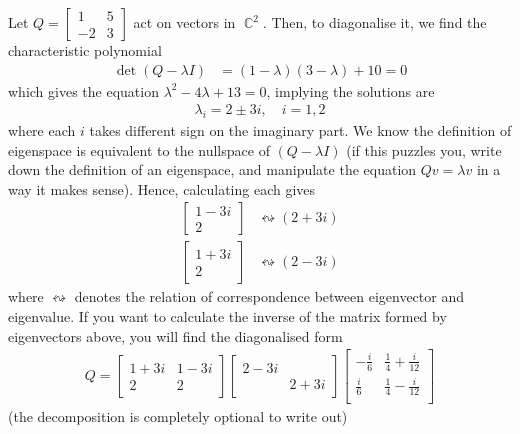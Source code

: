 \documentclass{amsart}
\theoremstyle{definition}
\theoremstyle{definition}
\DeclareMathOperator{\Com}{\mathbb{C}}
\DeclareMathOperator{\1}{\mathbbm{1}}
\begin{document}
\begin{enumerate}[itemsep = 2mm]
		Let $Q = \begin{bmatrix}
		 1 & 5 \\ -2 & 3
		\end{bmatrix}$ act on vectors in $\Com^2$. Then, to diagonalise it, we find the characteristic polynomial
		\begin{align*}
		\det(Q - \lambda I) &= (1-\lambda)(3-\lambda) + 10 = 0
		\end{align*}
		which gives the equation $\lambda^2 - 4\lambda + 13 = 0$, implying the solutions are
		\begin{align*}
		\lambda_i = 2 \pm 3 i, \quad i =1,2
		\end{align*}
		where each $i$ takes different sign on the imaginary part. We know the definition of eigenspace is equivalent to the nullspace of $(Q - \lambda I)$ (if this puzzles you, write down the definition of an eigenspace, and manipulate the equation $Qv = \lambda v$ in a way it makes sense). Hence, calculating each gives
		\begin{align*}
		\begin{bmatrix}
			1 - 3i \\ 2
		\end{bmatrix} & \leftrightsquigarrow (2+3i) \\
		\begin{bmatrix}
		1 + 3i \\ 2
		\end{bmatrix} & \leftrightsquigarrow (2-3i)
		\end{align*}
		where $\leftrightsquigarrow $ denotes the relation of correspondence between eigenvector and eigenvalue. If you want to calculate the inverse of the matrix formed by eigenvectors above, you will find the diagonalised form
		\begin{align*}
		Q = \begin{bmatrix}
		1 + 3i & 1 - 3 i \\ 2 & 2 
		\end{bmatrix} \begin{bmatrix}
		2 - 3i & \\ & 2 + 3i
		\end{bmatrix} \begin{bmatrix}
		- \frac{i}{6} & \frac{1}{4} + \frac{i}{12} \\
		\frac{i}{6} & \frac{1}{4} - \frac{i}{12} \\
		\end{bmatrix}
		\end{align*}
		(the decomposition is completely optional to write out)
		

\end{enumerate}
\end{document}
